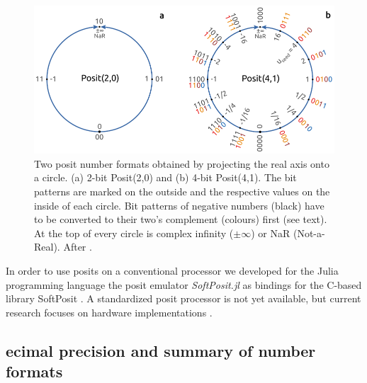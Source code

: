 \documentclass[draft]{agujournal2019}
\begin{document}
\begin{figure}[htbp]
\center
\includegraphics[width=1\textwidth]{circles.pdf}
\caption{Two posit number formats obtained by projecting the real axis onto a circle.
(a) 2-bit Posit(2,0) and (b) 4-bit Posit(4,1). The bit patterns are marked on the
outside and the respective values on the inside of each circle. Bit patterns of
negative numbers (black) have to be converted to their two's complement (colours)
first (see text). At the top of every circle is complex infinity ($\pm \infty$)
or NaR (Not-a-Real). After .}
\label{fig:circle}
\end{figure}

In order to use posits on a conventional processor we developed for the Julia
programming language \cite{Bezanson2017} the posit emulator \emph{SoftPosit.jl}
\cite{Klower2019} as bindings for the C-based library SoftPosit \cite{Leong2020}.
A standardized posit processor is not yet available, but current research focuses
on hardware implementations \cite{Zhang2020,vanDam2019,Chen2018,Chaurasiya2018,Glaser2017}.

\subsection{ecimal precision and summary of number formats}
\label{sec:decprec}
\end{document}
